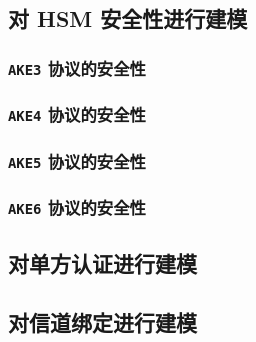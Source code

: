 \begin{theorem}\label{theo:21-2}
	
\end{theorem}

\subsection{对 HSM 安全性进行建模}\label{subsec:21-9-4}

\subsubsection{\texttt{AKE3} 协议的安全性}\label{subsubsec:21-9-4-1}

\begin{theorem}\label{theo:21-3}
	
\end{theorem}

\subsubsection{\texttt{AKE4} 协议的安全性}\label{subsubsec:21-9-4-2}

\begin{theorem}\label{theo:21-4}
	
\end{theorem}

\subsubsection{\texttt{AKE5} 协议的安全性}\label{subsubsec:21-9-4-3}

\begin{theorem}\label{theo:21-5}
	
\end{theorem}

\subsubsection{\texttt{AKE6} 协议的安全性}\label{subsubsec:21-9-4-4}

\begin{theorem}\label{theo:21-6}
	
\end{theorem}

\subsection{对单方认证进行建模}\label{subsec:21-9-5}

\subsection{对信道绑定进行建模}\label{subsec:21-9-6}

